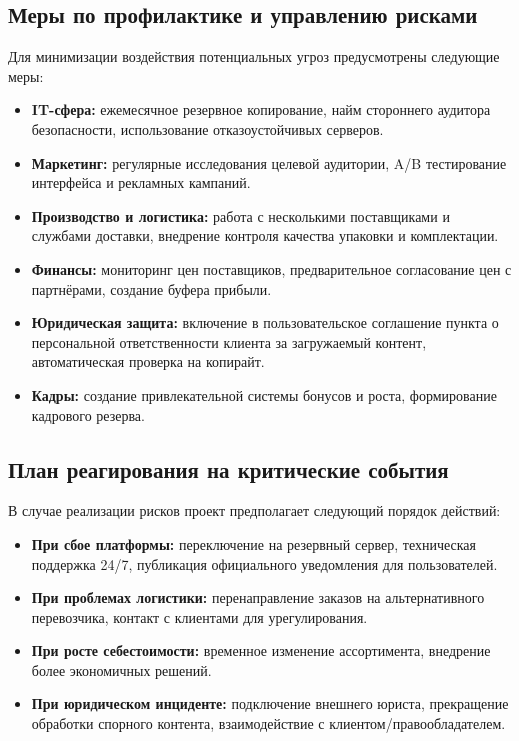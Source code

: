\subsection{Меры по профилактике и управлению рисками}

Для минимизации воздействия потенциальных угроз предусмотрены следующие меры:

\begin{itemize}
    \item \textbf{IT-сфера:} ежемесячное резервное копирование, найм стороннего аудитора безопасности, использование отказоустойчивых серверов.
    \item \textbf{Маркетинг:} регулярные исследования целевой аудитории, A/B тестирование интерфейса и рекламных кампаний.
    \item \textbf{Производство и логистика:} работа с несколькими поставщиками и службами доставки, внедрение контроля качества упаковки и комплектации.
    \item \textbf{Финансы:} мониторинг цен поставщиков, предварительное согласование цен с партнёрами, создание буфера прибыли.
    \item \textbf{Юридическая защита:} включение в пользовательское соглашение пункта о персональной ответственности клиента за загружаемый контент, автоматическая проверка на копирайт.
    \item \textbf{Кадры:} создание привлекательной системы бонусов и роста, формирование кадрового резерва.
\end{itemize}

\subsection{План реагирования на критические события}

В случае реализации рисков проект предполагает следующий порядок действий:

\begin{itemize}
    \item \textbf{При сбое платформы:} переключение на резервный сервер, техническая поддержка 24/7, публикация официального уведомления для пользователей.
    \item \textbf{При проблемах логистики:} перенаправление заказов на альтернативного перевозчика, контакт с клиентами для урегулирования.
    \item \textbf{При росте себестоимости:} временное изменение ассортимента, внедрение более экономичных решений.
    \item \textbf{При юридическом инциденте:} подключение внешнего юриста, прекращение обработки спорного контента, взаимодействие с клиентом/правообладателем.
\end{itemize}

